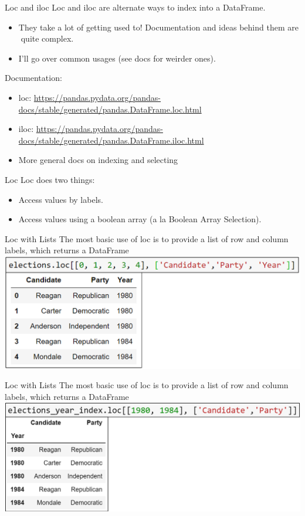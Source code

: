 \documentclass[aspectratio=169]{../latex_main/tntbeamer}  %
\begin{document}
	
	\begin{frame}{Loc and iloc}
	    Loc and iloc are alternate ways to index into a DataFrame.
	    \begin{itemize}
	        \item They take a lot of getting used to! Documentation and ideas behind them are quite complex.
	        \item I’ll go over common usages (see docs for weirder ones).
	    \end{itemize}
	    Documentation:
	    \begin{itemize}
	        \item loc: \url{https://pandas.pydata.org/pandas-docs/stable/generated/pandas.DataFrame.loc.html}
	        \item iloc:  \url{https://pandas.pydata.org/pandas-docs/stable/generated/pandas.DataFrame.iloc.html}
	        \item More general docs on indexing and selecting
	    \end{itemize}
	\end{frame}
	
	
	\begin{frame}{Loc}
	    Loc does two things:
	    \begin{itemize}
	        \item Access values by labels.
	        \item Access values using a boolean array (a la Boolean Array Selection).
	    \end{itemize}
	\end{frame}
	
	
	\begin{frame}{Loc with Lists}
	    The most basic use of loc is to provide a list of row and column labels, which returns a DataFrame
	    \includegraphics[scale=.43]{Bild24}
	\end{frame}
	
	\begin{frame}{Loc with Lists}
	    The most basic use of loc is to provide a list of row and column labels, which returns a DataFrame
	    \includegraphics[scale=.42]{Bild25}
	\end{frame}
	
\end{document}
